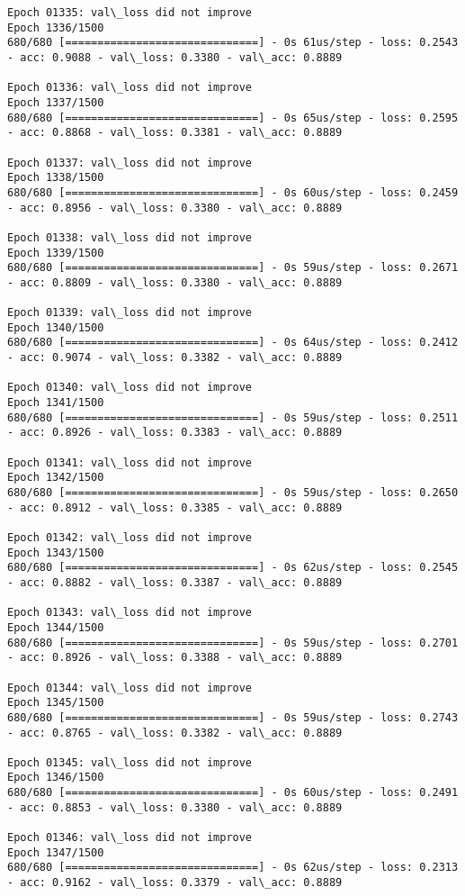 \documentclass[11pt]{article}
\begin{document}
\begin{Verbatim}[commandchars=\\\{\}]
Epoch 01335: val\_loss did not improve
Epoch 1336/1500
680/680 [==============================] - 0s 61us/step - loss: 0.2543 - acc: 0.9088 - val\_loss: 0.3380 - val\_acc: 0.8889

Epoch 01336: val\_loss did not improve
Epoch 1337/1500
680/680 [==============================] - 0s 65us/step - loss: 0.2595 - acc: 0.8868 - val\_loss: 0.3381 - val\_acc: 0.8889

Epoch 01337: val\_loss did not improve
Epoch 1338/1500
680/680 [==============================] - 0s 60us/step - loss: 0.2459 - acc: 0.8956 - val\_loss: 0.3380 - val\_acc: 0.8889

Epoch 01338: val\_loss did not improve
Epoch 1339/1500
680/680 [==============================] - 0s 59us/step - loss: 0.2671 - acc: 0.8809 - val\_loss: 0.3380 - val\_acc: 0.8889

Epoch 01339: val\_loss did not improve
Epoch 1340/1500
680/680 [==============================] - 0s 64us/step - loss: 0.2412 - acc: 0.9074 - val\_loss: 0.3382 - val\_acc: 0.8889

Epoch 01340: val\_loss did not improve
Epoch 1341/1500
680/680 [==============================] - 0s 59us/step - loss: 0.2511 - acc: 0.8926 - val\_loss: 0.3383 - val\_acc: 0.8889

Epoch 01341: val\_loss did not improve
Epoch 1342/1500
680/680 [==============================] - 0s 59us/step - loss: 0.2650 - acc: 0.8912 - val\_loss: 0.3385 - val\_acc: 0.8889

Epoch 01342: val\_loss did not improve
Epoch 1343/1500
680/680 [==============================] - 0s 62us/step - loss: 0.2545 - acc: 0.8882 - val\_loss: 0.3387 - val\_acc: 0.8889

Epoch 01343: val\_loss did not improve
Epoch 1344/1500
680/680 [==============================] - 0s 59us/step - loss: 0.2701 - acc: 0.8926 - val\_loss: 0.3388 - val\_acc: 0.8889

Epoch 01344: val\_loss did not improve
Epoch 1345/1500
680/680 [==============================] - 0s 59us/step - loss: 0.2743 - acc: 0.8765 - val\_loss: 0.3382 - val\_acc: 0.8889

Epoch 01345: val\_loss did not improve
Epoch 1346/1500
680/680 [==============================] - 0s 60us/step - loss: 0.2491 - acc: 0.8853 - val\_loss: 0.3380 - val\_acc: 0.8889

Epoch 01346: val\_loss did not improve
Epoch 1347/1500
680/680 [==============================] - 0s 62us/step - loss: 0.2313 - acc: 0.9162 - val\_loss: 0.3379 - val\_acc: 0.8889


\end{Verbatim}
\end{document}
